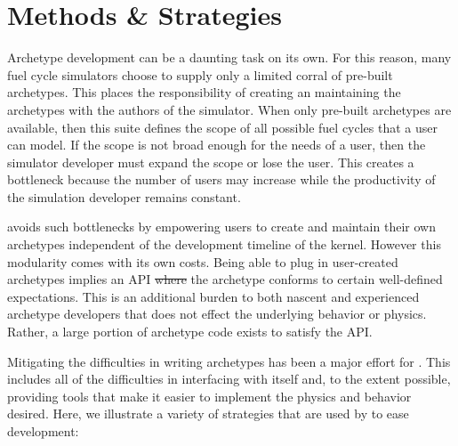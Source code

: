 \section{Methods \& Strategies}
\label{sec-methods}

Archetype development can be a daunting task on its own. For this reason, 
many fuel cycle simulators choose to supply only a limited corral of 
pre-built archetypes. This places the responsibility of creating an maintaining 
the archetypes with the authors of the simulator.  When only pre-built archetypes are available, then this suite defines the scope 
of all possible fuel cycles that a user can model. If the scope is not broad 
enough for the needs of a user, then the simulator developer  must expand the 
scope or lose the user.  This creates a bottleneck because the number of users 
may increase while the productivity of the simulation developer remains constant.

\Cyclus avoids such bottlenecks by empowering users to create and maintain 
their own archetypes independent of the development timeline of the \cyclus 
kernel. However this modularity comes with its own costs. Being able to 
plug in user-created archetypes implies an \gls{API} \sout{where}  
the archetype conforms to certain well-defined expectations. This is an 
additional burden to both nascent and experienced archetype developers that 
does not effect the underlying behavior or physics. Rather, a large portion 
of archetype code exists to satisfy the \cyclus \gls{API}. 

Mitigating the difficulties in writing archetypes has been a major effort 
for \cyclus. This includes all of the difficulties in interfacing with 
\cyclus itself and, to the extent possible, providing tools that make it 
easier to implement the physics and behavior desired. Here, we illustrate 
a variety of strategies that are used by \cyclus to ease development: 

